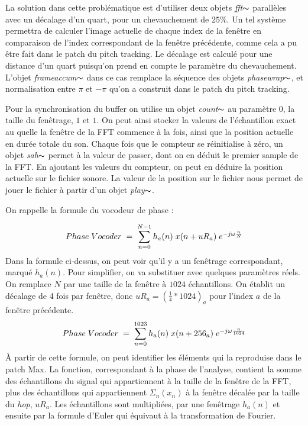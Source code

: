 La solution dans cette problématique est d'utiliser deux objets \textit{fft}$\thicksim$ parallèles avec un décalage d'un quart, pour un chevauchement de $25 \%$. Un tel système permettra de calculer l'image actuelle de chaque index de la fenêtre en comparaison de l'index correspondant de la fenêtre précédente, comme cela a pu être fait dans le patch du pitch tracking. Le décalage est calculé pour une distance d'un quart puisqu'on prend en compte le paramètre du chevauchement. L'objet \textit{frameaccum}$\thicksim$ dans ce cas remplace la séquence des objets \textit{phasewrap}$\thicksim$, et normalisation entre $\pi$ et $-\pi$ qu'on a construit dans le patch du pitch tracking.

Pour la synchronisation du buffer on utilise un objet \textit{count}$\thicksim$ au paramètre $0$, la taille du fenêtrage, $1$ et $1$. On peut ainsi stocker la valeurs de l'échantillon exact au quelle la fenêtre de la FFT commence à la fois, ainsi que la position actuelle en durée totale du son. Chaque fois que le compteur se réinitialise à zéro, un objet \textit{sah}$\thicksim$ permet à la valeur de passer, dont on en déduit le premier sample de la FFT. En ajoutant les valeurs du compteur, on peut en déduire la position actuelle sur le fichier sonore. La valeur de la position sur le fichier nous permet de jouer le fichier à partir d'un objet \textit{play}$\thicksim$. 

On rappelle la formule du vocodeur de phase : 

    \begin{equation*}
    Phase \; Vocoder \; = \; \sum_{n=0} ^{N-1} h_a(n) \; x(n + uR_a) \; e^{-j \omega \frac{n}{N}} \vspace{0.5cm} 
    \end{equation*}
Dans la formule ci-dessus, on peut voir qu'il y a un fenêtrage correspondant, marqué $h_a(n)$. Pour simplifier, on va substituer avec quelques paramètres réels. On remplace $N$ par une taille de la fenêtre à $1024$ échantillons. On établit un décalage de 4 fois par fenêtre, donc $uR_a = (\frac{1}{4} * 1024)_a$ pour l'index $a$ de la fenêtre précédente.  
    \begin{equation*}
    Phase \; Vocoder \; = \; \sum_{n=0} ^{1023} h_a(n) \; x(n + 256_a) \; e^{-j \omega \frac{n}{1024}} \vspace{0.5cm} 
    \end{equation*}
À partir de cette formule, on peut identifier les éléments qui la reproduise dans le patch Max. La fonction, correspondant à la phase de l'analyse, contient la somme des échantillons du signal qui appartiennent à la taille de la fenêtre de la FFT, plus des échantillons qui appartiennent $\Sigma_n (x_n) $ à la fenêtre décalée par la taille du \textit{hop}, $uR_a$. Les échantillons sont multipliées, par une fenêtrage $h_a(n)$ et ensuite par la formule d'Euler qui équivaut à la transformation de Fourier.

